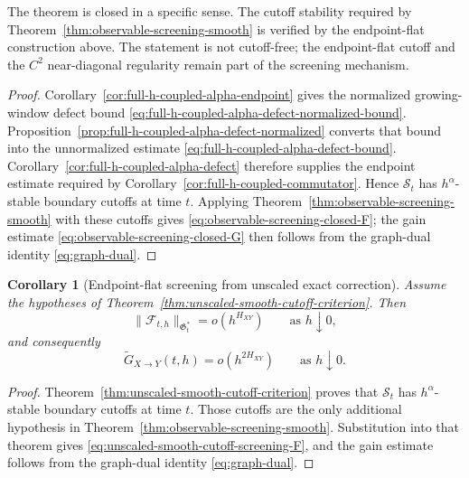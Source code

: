 \documentclass[11pt,a4paper]{amsart}
\theoremstyle{plain}
\newtheorem{corollary}[theorem]{Corollary}
\theoremstyle{definition}
\theoremstyle{remark}
\begin{document}
The theorem is closed in a specific sense.  The cutoff stability required by
Theorem~\ref{thm:observable-screening-smooth} is verified by the endpoint-flat construction above.
The statement is not cutoff-free; the endpoint-flat cutoff and the \(C^2\) near-diagonal
regularity remain part of the screening mechanism.

\begin{proof}
Corollary~\ref{cor:full-h-coupled-alpha-endpoint} gives the normalized growing-window defect bound
\eqref{eq:full-h-coupled-alpha-defect-normalized-bound}.
Proposition~\ref{prop:full-h-coupled-alpha-defect-normalized} converts that bound into the
unnormalized estimate \eqref{eq:full-h-coupled-alpha-defect-bound}.
Corollary~\ref{cor:full-h-coupled-alpha-defect} therefore supplies the endpoint estimate required
by Corollary~\ref{cor:full-h-coupled-commutator}.  Hence \(\mathcal S_t\) has
\(h^\alpha\)-stable boundary cutoffs at time \(t\).  Applying
Theorem~\ref{thm:observable-screening-smooth} with these cutoffs gives
\eqref{eq:observable-screening-closed-F}; the gain estimate
\eqref{eq:observable-screening-closed-G} then follows from the graph-dual identity
\eqref{eq:graph-dual}.
\end{proof}

\begin{corollary}[Endpoint-flat screening from unscaled exact correction]
\label{cor:unscaled-smooth-cutoff-screening}
Assume the hypotheses of Theorem~\ref{thm:unscaled-smooth-cutoff-criterion}. Then
\begin{equation}\label{eq:unscaled-smooth-cutoff-screening-F}
\|\mathcal F_{t,h}\|_{\mathfrak G_t^*}
=
o(h^{H_{XY}})
\qquad\text{as }h\downarrow0,
\end{equation}
and consequently
\begin{equation}\label{eq:unscaled-smooth-cutoff-screening-G}
\widetilde G_{X\to Y}(t,h)
=
o(h^{2H_{XY}})
\qquad\text{as }h\downarrow0.
\end{equation}
\end{corollary}

\begin{proof}
Theorem~\ref{thm:unscaled-smooth-cutoff-criterion} proves that \(\mathcal S_t\) has
\(h^\alpha\)-stable boundary cutoffs at time \(t\).  Those cutoffs are the only additional
hypothesis in Theorem~\ref{thm:observable-screening-smooth}.  Substitution into that theorem gives
\eqref{eq:unscaled-smooth-cutoff-screening-F}, and the gain estimate follows from the graph-dual
identity \eqref{eq:graph-dual}.
\end{proof}
\end{document}
